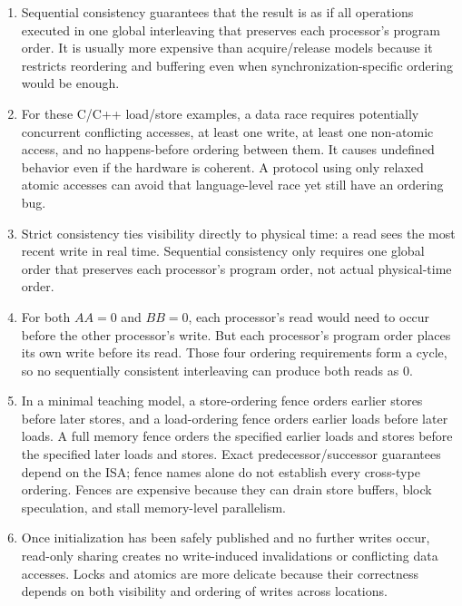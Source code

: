 \documentclass[11pt]{article}
\begin{document}
\begin{enumerate}
    \item Sequential consistency guarantees that the result is as if all operations executed in one global interleaving that preserves each processor's program order.
    It is usually more expensive than acquire/release models because it restricts reordering and buffering even when synchronization-specific ordering would be enough.

    \item For these C/C++ load/store examples, a data race requires potentially concurrent conflicting accesses, at least one write, at least one non-atomic access, and no happens-before ordering between them.
    It causes undefined behavior even if the hardware is coherent.
    A protocol using only relaxed atomic accesses can avoid that language-level race yet still have an ordering bug.

    \item Strict consistency ties visibility directly to physical time: a read sees the most recent write in real time.
    Sequential consistency only requires one global order that preserves each processor's program order, not actual physical-time order.

    \item For both \(AA=0\) and \(BB=0\), each processor's read would need to occur before the other processor's write.
    But each processor's program order places its own write before its read.
    Those four ordering requirements form a cycle, so no sequentially consistent interleaving can produce both reads as 0.

    \item In a minimal teaching model, a store-ordering fence orders earlier stores before later stores, and a load-ordering fence orders earlier loads before later loads.
    A full memory fence orders the specified earlier loads and stores before the specified later loads and stores.
    Exact predecessor/successor guarantees depend on the ISA; fence names alone do not establish every cross-type ordering.
    Fences are expensive because they can drain store buffers, block speculation, and stall memory-level parallelism.

    \item Once initialization has been safely published and no further writes occur, read-only sharing creates no write-induced invalidations or conflicting data accesses.
    Locks and atomics are more delicate because their correctness depends on both visibility and ordering of writes across locations.
\end{enumerate}
\end{document}
